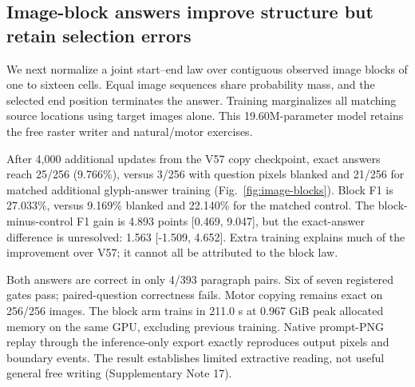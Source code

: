 \subsection*{Image-block answers improve structure but retain selection errors}
We next normalize a joint start--end law over contiguous observed image
blocks of one to sixteen cells. Equal image sequences share probability mass,
and the selected end position terminates the answer. Training marginalizes
all matching source locations using target images alone. This 19.60M-parameter
model retains the free raster writer and natural/motor exercises.

After 4,000 additional updates from the V57 copy checkpoint, exact answers
reach 25/256 (9.766\%), versus 3/256 with question pixels blanked and 21/256
for matched additional glyph-answer training (Fig.~\ref{fig:image-blocks}).
Block F1 is 27.033\%, versus 9.169\% blanked and 22.140\% for the matched
control. The block-minus-control F1 gain is 4.893 points [0.469, 9.047],
but the exact-answer difference is unresolved: 1.563 [-1.509, 4.652].
Extra training explains much of the improvement over V57; it cannot all be
attributed to the block law.

Both answers are correct in only 4/393 paragraph pairs. Six of seven
registered gates pass; paired-question correctness fails. Motor copying
remains exact on 256/256 images. The block arm trains in 211.0 s at
0.967 GiB peak allocated memory on the same GPU, excluding previous training.
Native prompt-PNG replay through the inference-only export exactly reproduces
output pixels and boundary events. The result establishes limited extractive
reading, not useful general free writing (Supplementary Note 17).



